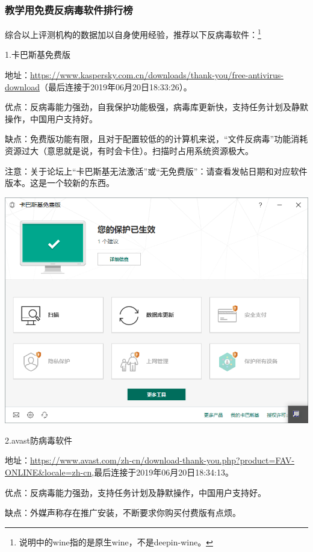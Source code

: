 \subsubsection{教学用免费反病毒软件排行榜}
综合以上评测机构的数据加以自身使用经验，推荐以下反病毒软件：\footnote{说明中的wine指的是原生wine，不是deepin-wine。}\par
1.卡巴斯基免费版\par
地址：\url{https://www.kaspersky.com.cn/downloads/thank-you/free-antivirus-download}（最后连接于2019年06月20日18:33:26）。\par
优点：反病毒能力强劲，自我保护功能极强，病毒库更新快，支持任务计划及静默操作，中国用户支持好。\par
缺点：免费版功能有限，且对于配置较低的的计算机来说，“文件反病毒”功能消耗资源过大（意思就是说，有时会卡住）。扫描时占用系统资源极大。\par
注意：关于论坛上“卡巴斯基无法激活”或“无免费版”：请查看发帖日期和对应软件版本。这是一个较新的东西。
\begin{center}
	\includegraphics[scale=0.6]{pic/kfa}
\end{center} \par
2.avast防病毒软件\par
地址：\url{https://www.avast.com/zh-cn/download-thank-you.php?product=FAV-ONLINE\&locale=zh-cn},最后连接于2019年06月20日18:34:13。\par
优点：反病毒能力强劲，支持任务计划及静默操作，中国用户支持好。\par
缺点：外媒声称存在推广安装，不断要求你购买付费版有点烦。
